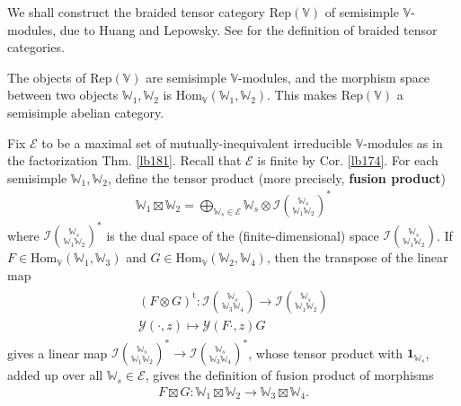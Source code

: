 \documentclass[12pt,a4paper,notitlepage]{article}
\theoremstyle{definition}
\theoremstyle{plain}
\newcommand{\mc}{\mathcal}
\newcommand{\wtd}{\widetilde}
\newcommand{\tr}{\mathrm{t}} %
\newcommand{\id}{\mathbf{1}}
\newcommand{\Hom}{\mathrm{Hom}}
\newcommand{\Rep}{\mathrm{Rep}}
\newcommand{\Vbb}{\mathbb V}
\newcommand{\Wbb}{\mathbb W}
\numberwithin{equation}{section}
\begin{document}

We shall construct the braided tensor category $\Rep(\Vbb)$ of semisimple $\Vbb$-modules, due to Huang and Lepowsky. See \cite{BK,EGNO} for the definition of braided tensor categories.   





The objects of $\Rep(\Vbb)$ are semisimple $\Vbb$-modules, and the morphism space between two objects $\Wbb_1,\Wbb_2$ is $\Hom_\Vbb(\Wbb_1,\Wbb_2)$. This makes $\Rep(\Vbb)$ a semisimple abelian category.

Fix $\mc E$ to be a maximal set of mutually-inequivalent irreducible $\Vbb$-modules as in the factorization Thm. \ref{lb181}. Recall that $\mc E$ is finite by Cor. \ref{lb174}. For each semisimple $\Wbb_1,\Wbb_2$, define the tensor product (more precisely, \textbf{fusion product})
\begin{align}
\Wbb_1\boxtimes\Wbb_2=\bigoplus_{\Wbb_s\in\mc E}\Wbb_s\otimes\mc I{\Wbb_s\choose \Wbb_1\Wbb_2}^*
\end{align}
where $\mc I{\Wbb_s\choose \Wbb_1\Wbb_2}^*$ is the dual space of the (finite-dimensional) space $\mc I{\Wbb_s\choose \Wbb_1\Wbb_2}$. If $F\in\Hom_\Vbb(\Wbb_1,\Wbb_3)$ and $G\in\Hom_\Vbb(\Wbb_2,\Wbb_4)$, then the transpose of the linear map
\begin{gather}
\begin{gathered}
(F\otimes G)^\tr:\mc I{\Wbb_s\choose \Wbb_3\Wbb_4}\rightarrow \mc I{\Wbb_s\choose \Wbb_1\Wbb_2}\\
\mc Y(\cdot,z)\mapsto\mc Y(F\cdot,z)G 
\end{gathered}
\end{gather}
gives a linear map $\mc I{\Wbb_s\choose \Wbb_1\Wbb_2}^*\rightarrow \mc I{\Wbb_s\choose \Wbb_3\Wbb_4}^*$, whose tensor product with $\id_{\Wbb_s}$, added up over all $\Wbb_s\in\mc E$, gives the definition of fusion product of morphisms
\begin{align}
F\boxtimes G:\Wbb_1\boxtimes\Wbb_2\rightarrow\Wbb_3\boxtimes\Wbb_4.
\end{align}

\subsection{}
\end{document}
